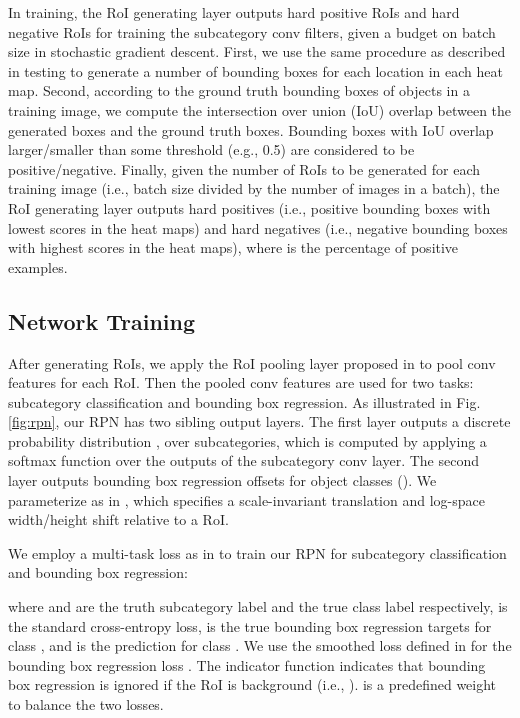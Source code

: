 \documentclass[10pt,twocolumn,letterpaper]{article}
\begin{document}
In training, the RoI generating layer outputs hard positive RoIs and hard negative RoIs for training the subcategory conv filters, given a budget on batch size in stochastic gradient descent. First, we use the same procedure as described in testing to generate a number of bounding boxes for each location in each heat map. Second, according to the ground truth bounding boxes of objects in a training image, we compute the intersection over union (IoU) overlap between the generated boxes and the ground truth boxes. Bounding boxes with IoU overlap larger/smaller than some threshold (e.g., 0.5) are considered to be positive/negative. Finally, given the number of RoIs to be generated for each training image  (i.e., batch size divided by the number of images in a batch), the RoI generating layer outputs  hard positives (i.e.,  positive bounding boxes with lowest scores in the heat maps) and  hard negatives (i.e.,  negative bounding boxes with highest scores in the heat maps), where  is the percentage of positive examples. 



\subsection{Network Training} \label{sec:rpn_loss}

After generating RoIs, we apply the RoI pooling layer proposed in \cite{girshick2015fast} to pool conv features for each RoI. Then the pooled conv features are used for two tasks: subcategory classification and bounding box regression. As illustrated in Fig. \ref{fig:rpn}, our RPN has two sibling output layers. The first layer outputs a discrete probability distribution , over  subcategories, which is computed by applying a softmax function over the  outputs of the subcategory conv layer. The second layer outputs bounding box regression offsets  for  object classes (). We parameterize  as in \cite{girshick2013rich}, which specifies a scale-invariant translation and log-space width/height shift relative to a RoI.

We employ a multi-task loss as in \cite{girshick2015fast} to train our RPN for subcategory classification and bounding box regression:

where  and  are the truth subcategory label and the true class label respectively,  is the standard cross-entropy loss,  is the true bounding box regression targets for class , and  is the prediction for class . We use the smoothed  loss defined in \cite{girshick2015fast} for the bounding box regression loss . The indicator function  indicates that bounding box regression is ignored if the RoI is background (i.e., ).  is a predefined weight to balance the two losses.
\end{document}
